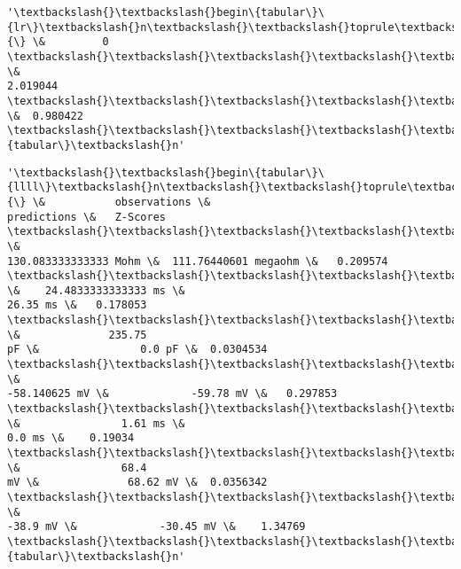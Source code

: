             \begin{tcolorbox}[breakable, size=fbox, boxrule=.5pt, pad at break*=1mm, opacityfill=0]
\begin{Verbatim}[commandchars=\\\{\}]
'\textbackslash{}\textbackslash{}begin\{tabular\}\{lr\}\textbackslash{}n\textbackslash{}\textbackslash{}toprule\textbackslash{}n\{\} \&         0 \textbackslash{}\textbackslash{}\textbackslash{}\textbackslash{}\textbackslash{}n\textbackslash{}\textbackslash{}midrule\textbackslash{}nchi\textbackslash{}\textbackslash{}\_square \&
2.019044 \textbackslash{}\textbackslash{}\textbackslash{}\textbackslash{}\textbackslash{}np\textbackslash{}\textbackslash{}\_value    \&  0.980422 \textbackslash{}\textbackslash{}\textbackslash{}\textbackslash{}\textbackslash{}n\textbackslash{}\textbackslash{}bottomrule\textbackslash{}n\textbackslash{}\textbackslash{}end\{tabular\}\textbackslash{}n'
\end{Verbatim}
\end{tcolorbox}
        
            \begin{tcolorbox}[breakable, size=fbox, boxrule=.5pt, pad at break*=1mm, opacityfill=0]
\begin{Verbatim}[commandchars=\\\{\}]
'\textbackslash{}\textbackslash{}begin\{tabular\}\{llll\}\textbackslash{}n\textbackslash{}\textbackslash{}toprule\textbackslash{}n\{\} \&           observations \&
predictions \&   Z-Scores \textbackslash{}\textbackslash{}\textbackslash{}\textbackslash{}\textbackslash{}n\textbackslash{}\textbackslash{}midrule\textbackslash{}nInputResistanceTest            \&
130.083333333333 Mohm \&  111.76440601 megaohm \&   0.209574
\textbackslash{}\textbackslash{}\textbackslash{}\textbackslash{}\textbackslash{}nTimeConstantTest               \&    24.4833333333333 ms \&
26.35 ms \&   0.178053 \textbackslash{}\textbackslash{}\textbackslash{}\textbackslash{}\textbackslash{}nCapacitanceTest                \&              235.75
pF \&                0.0 pF \&  0.0304534 \textbackslash{}\textbackslash{}\textbackslash{}\textbackslash{}\textbackslash{}nRestingPotentialTest           \&
-58.140625 mV \&             -59.78 mV \&   0.297853
\textbackslash{}\textbackslash{}\textbackslash{}\textbackslash{}\textbackslash{}nInjectedCurrentAPWidthTest     \&                1.61 ms \&
0.0 ms \&    0.19034 \textbackslash{}\textbackslash{}\textbackslash{}\textbackslash{}\textbackslash{}nInjectedCurrentAPAmplitudeTest \&                68.4
mV \&              68.62 mV \&  0.0356342 \textbackslash{}\textbackslash{}\textbackslash{}\textbackslash{}\textbackslash{}nInjectedCurrentAPThresholdTest \&
-38.9 mV \&             -30.45 mV \&    1.34769
\textbackslash{}\textbackslash{}\textbackslash{}\textbackslash{}\textbackslash{}n\textbackslash{}\textbackslash{}bottomrule\textbackslash{}n\textbackslash{}\textbackslash{}end\{tabular\}\textbackslash{}n'
\end{Verbatim}
\end{tcolorbox}
        
